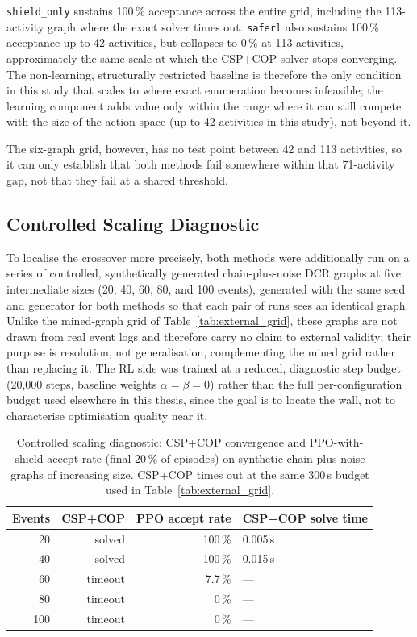 \texttt{shield\_only} sustains 100\,\% acceptance across the entire
grid, including the 113-activity graph where the exact solver times
out. \texttt{saferl} also sustains 100\,\% acceptance up to 42
activities, but collapses to 0\,\% at 113 activities, approximately the
same scale at which the CSP+COP solver stops converging. The
non-learning, structurally restricted baseline is therefore the only
condition in this study that scales to where exact enumeration becomes
infeasible; the learning component adds value only within the range
where it can still compete with the size of the action space (up to 42
activities in this study), not beyond it.

The six-graph grid, however, has no test point between 42 and 113
activities, so it can only establish that both methods fail somewhere
within that 71-activity gap, not that they fail at a shared threshold.

\subsection{Controlled Scaling Diagnostic}
\label{sec:external_scaling_diagnostic}

To localise the crossover more precisely, both methods were additionally
run on a series of controlled, synthetically generated chain-plus-noise
\ac{DCR} graphs at five intermediate sizes (20, 40, 60, 80, and 100
events), generated with the same seed and generator for both methods so
that each pair of runs sees an identical graph. Unlike the mined-graph
grid of Table~\ref{tab:external_grid}, these graphs are not drawn from
real event logs and therefore carry no claim to external validity; their
purpose is resolution, not generalisation, complementing the mined grid
rather than replacing it. The \ac{RL} side was trained at a reduced,
diagnostic step budget (20,000 steps, baseline weights $\alpha=\beta=0$)
rather than the full per-configuration budget used elsewhere in this
thesis, since the goal is to locate the wall, not to characterise
optimisation quality near it.

\begin{table}[H]
\centering
\caption{Controlled scaling diagnostic: CSP+COP convergence and
\ac{PPO}-with-shield accept rate (final 20\,\% of episodes) on synthetic
chain-plus-noise graphs of increasing size. CSP+COP times out at the
same 300\,s budget used in Table~\ref{tab:external_grid}.}
\label{tab:scaling_diagnostic}
\begin{tabular}{rrrl}
\toprule
\textbf{Events} & \textbf{CSP+COP} & \textbf{PPO accept rate} & \textbf{CSP+COP solve time} \\
\midrule
20  & solved  & 100\,\%  & 0.005\,s \\
40  & solved  & 100\,\%  & 0.015\,s \\
60  & timeout & 7.7\,\%  & --- \\
80  & timeout & 0\,\%    & --- \\
100 & timeout & 0\,\%    & --- \\
\bottomrule
\end{tabular}
\end{table}

